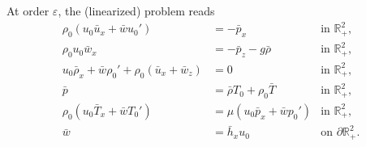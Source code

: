 \documentclass[11pt,twoside,reqno,centertags]{amsart}
\theoremstyle{definition}
\newcommand{\R}{\mathbb R}
\begin{document}
At order $\varepsilon$, the (linearized) problem reads \cite{Constantin23,Smith79}
\begin{subequations}\label{eq:system_linear}
	\begin{align}
		\rho_0 (u_0 \bar u_x + \bar w u_0') &= -\bar p_x & \text{in }\R^2_+,\label{eq:Euler1_linear}\\
		\rho_0 u_0 \bar w_x &= -\bar p_z - g\bar\rho & \text{in }\R^2_+,\label{eq:Euler2_linear}\\
		u_0 \bar\rho_x + \bar w \rho_0' + \rho_0 (\bar u_x + \bar w_z) &= 0 & \text{in }\R^2_+,\label{eq:mass_conservation_linear}\\
		\bar p &= \bar\rho T_0 + \rho_0 \bar T & \text{in }\R^2_+,\label{eq:gas_law_linear}\\
		\rho_0(u_0 \bar T_x + \bar w T_0') &= \mu (u_0 \bar p_x + \bar w p_0') & \text{in }\R^2_+,\label{eq:thermolaw_linear}\\
		\bar w &= \bar h_x u_0 & \text{on }\partial\R^2_+.\label{eq:kinematic_BC_linear}
	\end{align}
\end{subequations}
\end{document}
